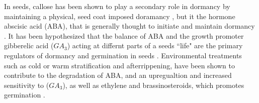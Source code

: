 \documentclass[12pt]{article}\usepackage[]{graphicx}\usepackage[]{color}
\begin{document}
\par In seeds, callose has been shown to play a secondary role in dormancy by maintaining a physical, seed coat imposed doramancy \citep{Leubner2003}, but it the hormone abscisic acid (ABA), that is generally thought to initiate and maintain dormancy \citep{Baskin2014, Fenner2000}. It has been hypothesized that the balance of ABA and the growth promoter gibberelic acid ($GA_3$) acting at differnt parts of a seeds ``life" are the primary regulators of dormancy and germination in seeds \citep{Leubner2003,Kucera2005}. Environmental treatments such as cold or warm stratification and afterrippening, have been shown to contribute to the degradation of ABA, and an upregualtion and increased sensitivity to ($GA_3$), as well as ethylene and brassinosteroids, which promotes germination \citep{Kucera2005}.
\end{document}
